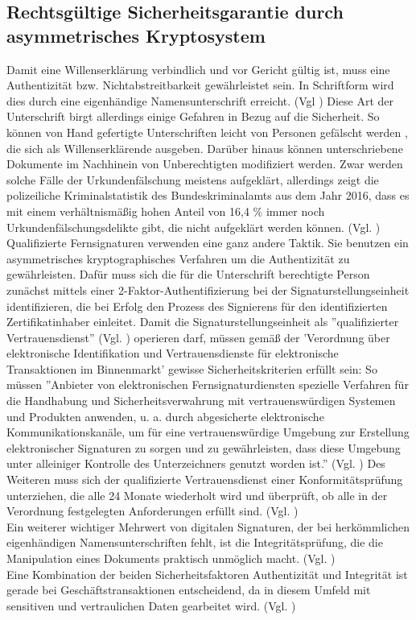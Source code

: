 \documentclass[deutsch]{lib/llncs/llncs}
\begin{document}
\subsection{Rechtsgültige Sicherheitsgarantie durch asymmetrisches Kryptosystem}
Damit eine Willenserklärung verbindlich und vor Gericht gültig ist, muss eine Authentizität bzw. Nichtabstreitbarkeit gewährleistet sein. In Schriftform wird dies durch eine eigenhändige Namensunterschrift erreicht. (Vgl \cite[S. 5-6]{Zitat07}) Diese Art der Unterschrift birgt allerdings einige Gefahren in Bezug auf die Sicherheit. So können von Hand gefertigte Unterschriften leicht von Personen gefälscht werden , die sich als Willenserklärende ausgeben. Darüber hinaus können unterschriebene Dokumente im Nachhinein von Unberechtigten modifiziert werden. Zwar werden solche Fälle der Urkundenfälschung meistens aufgeklärt, allerdings zeigt die polizeiliche Kriminalstatistik des Bundeskriminalamts aus dem Jahr 2016, dass es mit einem verhältnismäßig hohen Anteil von 16,4 \% immer noch Urkundenfälschungsdelikte gibt, die nicht aufgeklärt werden können. (Vgl. \cite[S. 34]{Zitat10})\\
Qualifizierte Fernsignaturen verwenden eine ganz andere Taktik. Sie benutzen ein asymmetrisches kryptographisches Verfahren um die Authentizität zu gewährleisten. Dafür muss sich die für die Unterschrift berechtigte Person zunächst mittels einer 2-Faktor-Authentifizierung bei der Signaturstellungseinheit identifizieren, die bei Erfolg den Prozess des Signierens für den identifizierten Zertifikatinhaber einleitet. Damit die Signaturstellungseinheit als ''qualifizierter Vertrauensdienst'' (Vgl. \cite[S. 30]{Zitat08}) operieren darf, müssen gemäß der 'Verordnung über elektronische Identifikation und Vertrauensdienste für elektronische Transaktionen im Binnenmarkt' gewisse Sicherheitskriterien erfüllt sein: So müssen ''Anbieter von elektronischen Fernsignaturdiensten spezielle Verfahren für die Handhabung und Sicherheitsverwahrung mit vertrauenswürdigen Systemen und Produkten anwenden, u. a. durch abgesicherte elektronische Kommunikationskanäle, um für eine vertrauenswürdige Umgebung zur Erstellung elektronischer Signaturen zu sorgen und zu gewährleisten, dass diese Umgebung unter alleiniger Kontrolle des Unterzeichners genutzt worden ist.'' (Vgl. \cite[S. 233]{Zitat09}) Des Weiteren muss sich der qualifizierte Vertrauensdienst einer Konformitätsprüfung unterziehen, die alle 24 Monate wiederholt wird und überprüft, ob alle in der Verordnung festgelegten Anforderungen erfüllt sind. (Vgl. \cite[S. 30]{Zitat08}) \\
Ein weiterer wichtiger Mehrwert von digitalen Signaturen, der bei herkömmlichen eigenhändigen Namensunterschriften fehlt, ist die Integritätsprüfung, die die Manipulation eines Dokuments praktisch unmöglich macht. (Vgl. \cite[S. 7]{Zitat05}) \\
Eine Kombination der beiden Sicherheitsfaktoren Authentizität und Integrität ist gerade bei Geschäftstransaktionen entscheidend, da in diesem Umfeld mit sensitiven und vertraulichen Daten gearbeitet wird. (Vgl. \cite[S. 7]{Zitat05})
\end{document}
